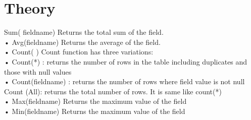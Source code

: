 \documentclass[13pt,oneside]{book}
\begin{document}
			\section*{Theory}
			Sum( fieldname) Returns the total sum of the field.\\
• Avg(fieldname) Returns the average of the field.\\
• Count( ) Count function has three variations:\\
• Count(*) : returns the number of rows in the table including duplicates and
those with null values\\
• Count(fieldname) : returns the number of rows where field value is not null\\
Count (All): returns the total number of rows. It is same like count(*)\\
• Max(fieldname) Returns the maximum value of the field\\
• Min(fieldname) Returns the maximum value of the field\\
			
\end{document}
